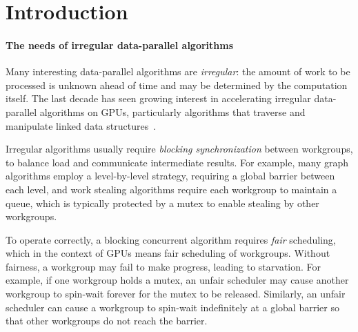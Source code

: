 \documentclass[numbers,nocopyrightspace,10pt]{sigplanconf}
\begin{document}
\section{Introduction}\label{sec:intro}

\paragraph{The needs of irregular data-parallel algorithms}
Many
interesting data-parallel algorithms are \emph{irregular}: the amount
of work to be processed is unknown ahead of time and may be determined
by the computation itself.  The last decade has seen growing interest in accelerating irregular
data-parallel algorithms on GPUs, particularly algorithms that
traverse and manipulate linked data structures~\cite{owens-persistent,TPO10,DBLP:conf/ipps/KaleemVPHP16,DBLP:conf/ipps/DavidsonBGO14,DBLP:conf/hipc/HarishN07,DBLP:journals/topc/MerrillGG15,DBLP:conf/egh/VineetHPN09,DBLP:conf/ppopp/NobariCKB12,DBLP:conf/hpcc/SolomonTT10a,DBLP:conf/popl/PrabhuRMH11,DBLP:conf/ppopp/Mendez-LojoBP12,DBLP:conf/oopsla/PaiP16,DBLP:conf/ipps/KaleemVPHP16,DBLP:conf/oopsla/SorensenDBGR16,dlb-web,TPO10}.

Irregular algorithms usually require \emph{blocking synchronization}
between workgroups, to balance load and communicate intermediate
results.  For example, many graph algorithms employ a level-by-level strategy, requiring a global barrier between each level, and 
work stealing algorithms require each workgroup
to maintain a queue, which is typically protected by a mutex to enable
stealing by other workgroups.

To operate correctly, a blocking concurrent algorithm requires
\emph{fair} scheduling, which in the context of GPUs means fair scheduling of workgroups.  Without fairness, a
workgroup may fail to make progress, leading to starvation.  For
example, if one workgroup holds a mutex, an unfair scheduler may cause
another workgroup to spin-wait forever for the mutex to be
released.  Similarly, an unfair scheduler can cause a workgroup to spin-wait
indefinitely at a global barrier so that other workgroups do not reach the barrier.
\end{document}

